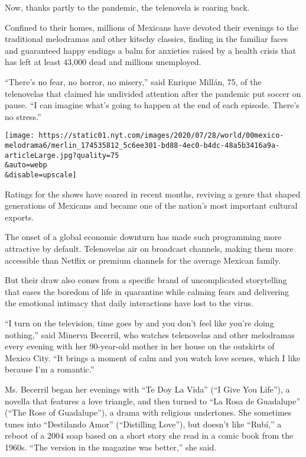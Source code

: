 Now, thanks partly to the pandemic, the telenovela is roaring back.

Confined to their homes, millions of Mexicans have devoted their
evenings to the traditional melodramas and other kitschy classics,
finding in the familiar faces and guaranteed happy endings a balm for
anxieties raised by a health crisis that has left at least 43,000 dead
and millions unemployed.

``There's no fear, no horror, no misery,'' said Enrique Millán, 75, of
the telenovelas that claimed his undivided attention after the pandemic
put soccer on pause. ``I can imagine what's going to happen at the end
of each episode. There's no stress.''

\texttt{[image: https://static01.nyt.com/images/2020/07/28/world/00mexico-melodrama6/merlin\_174535812\_5c6ee301-bd88-4ec0-b4dc-48a5b3416a9a-articleLarge.jpg?quality=75\\\&auto=webp\\\&disable=upscale]}

Ratings for the shows have soared in recent months, reviving a genre
that shaped generations of Mexicans and became one of the nation's most
important cultural exports.

The onset of a global economic downturn has made such programming more
attractive by default. Telenovelas air on broadcast channels, making
them more accessible than Netflix or premium channels for the average
Mexican family.

But their draw also comes from a specific brand of uncomplicated
storytelling that eases the boredom of life in quarantine while calming
fears and delivering the emotional intimacy that daily interactions have
lost to the virus.

``I turn on the television, time goes by and you don't feel like you're
doing nothing,'' said Minerva Becerril, who watches telenovelas and
other melodramas every evening with her 90-year-old mother in her house
on the outskirts of Mexico City. ``It brings a moment of calm and you
watch love scenes, which I like because I'm a romantic.''

Ms. Becerril began her evenings with ``Te Doy La Vida'' (``I Give You
Life''), a novella that features a love triangle, and then turned to
``La Rosa de Guadalupe'' (``The Rose of Guadalupe''), a drama with
religious undertones. She sometimes tunes into ``Destilando Amor''
(``Distilling Love''), but doesn't like ``Rubí,'' a reboot of a 2004
soap based on a short story she read in a comic book from the 1960s.
``The version in the magazine was better,'' she said.

